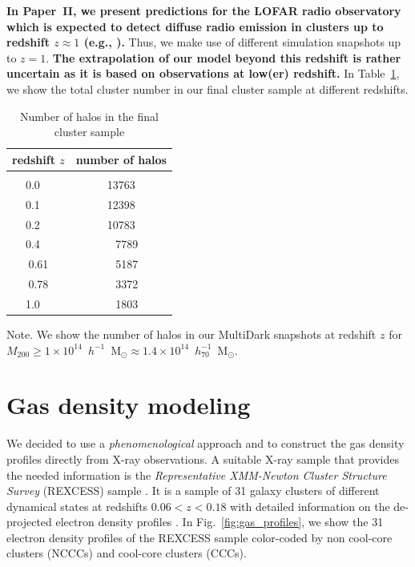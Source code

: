 \documentclass[useAMS,usenatbib]{mn2e}
\begin{document}
{\bf In Paper~II, we present predictions for the LOFAR radio observatory
which is expected to detect diffuse radio emission in clusters up to redshift $z \approx 1$ (e.g.,
\citealp{2012JApA..tmp...34R}).} Thus, we make use of different simulation snapshots up to $z=1$. 
{\bf The extrapolation of our model beyond this redshift is rather uncertain as it is based
on observations at low(er) redshift.} In Table~\ref{tab:z}, we show the total cluster number in 
our final cluster sample at different redshifts.

\begin{table} 
\begin{center}
\caption{Number of halos in the final cluster sample}
\medskip
\begin{tabular}{cc}
\hline
\phantom{\Big|}
redshift $z$ & number of halos \\
\hline\\[-0.5em]
 0.0~~ &  13763\\
 0.1~~ &  12398\\
 0.2~~ &  10783\\ 
 0.4~~ &   ~~7789\\ 
 0.61  &  ~~5187\\ 
 0.78  &  ~~3372\\ 
 1.0~~ &  ~~1803\\[0.5em]
\hline
\end{tabular}
\label{tab:z}
\end{center}
\footnotesize{Note. We show the number of halos in our MultiDark snapshots at redshift $z$ for $M_{200}\geq1\times10^{14}$~$h^{-1}$~M$_{\odot}\approx1.4\times10^{14}$~$h_{70}^{-1}$~M$_{\odot}$. }
\end{table}


\section{Gas density modeling}
\label{sec:3}

We decided to use a \emph{phenomenological} approach and to construct the gas
density profiles directly from X-ray observations. A suitable X-ray sample that
provides the needed information is the \emph{Representative XMM-Newton Cluster
  Structure Survey} (REXCESS) sample \citep{2008A&A...487..431C,
  2009A&A...498..361P}. It is a sample of 31 galaxy clusters of different
dynamical states at redshifts $0.06<z<0.18$ with detailed information on the
de-projected electron density profiles \citep{2008A&A...487..431C}. In
Fig.~\ref{fig:gas_profiles}, we show the 31 electron density profiles of the
REXCESS sample color-coded by non cool-core clusters (NCCCs) and 
cool-core clusters (CCCs). 
\end{document}
